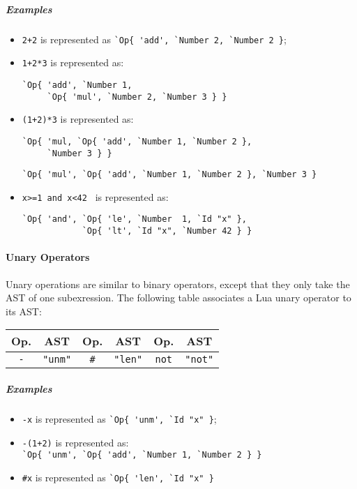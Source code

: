 \subparagraph{Examples}
\begin{itemize}
\item \verb|2+2| is represented as
  \verb|`Op{ 'add', `Number 2, `Number 2 }|;
\item \verb|1+2*3| is represented as:\\[-2em]
\begin{verbatim}
`Op{ 'add', `Number 1,
     `Op{ 'mul', `Number 2, `Number 3 } }
\end{verbatim}
\item \verb|(1+2)*3| is represented as:\\[-2em]
\begin{verbatim}
`Op{ 'mul, `Op{ 'add', `Number 1, `Number 2 },
     `Number 3 } }
\end{verbatim}

  \verb|`Op{ 'mul', `Op{ 'add', `Number 1, `Number 2 }, `Number 3 }|
\item \verb|x>=1 and x<42 | is represented as:\\[-2em]
\begin{verbatim}
`Op{ 'and', `Op{ 'le', `Number  1, `Id "x" },
            `Op{ 'lt', `Id "x", `Number 42 } }

\end{verbatim}
\end{itemize}

\paragraph{Unary Operators}
Unary operations are similar to binary operators, except that they
only take the AST of one subexression. The following table associates
a Lua unary operator to its AST:

\begin{center}
\begin{tabular}{|c|c||c|c||c|c|}
  \hline
  \bf Op. & \bf AST &
  \bf Op. & \bf AST &
  \bf Op. & \bf AST \\

  \hline\hline %
  \verb+-+   & \verb+"unm"+ &
  \verb+#+   & \verb+"len"+ &
  \verb+not+ & \verb+"not"+ \\
  \hline %
\end{tabular}
\end{center}

\subparagraph{Examples}
\begin{itemize}
\item \verb|-x| is represented as \verb|`Op{ 'unm', `Id "x" }|;
\item \verb|-(1+2)| is represented as:\\
  \verb|`Op{ 'unm', `Op{ 'add', `Number 1, `Number 2 } }|
\item \verb|#x| is represented as
  \verb|`Op{ 'len', `Id "x" }|
\end{itemize}

